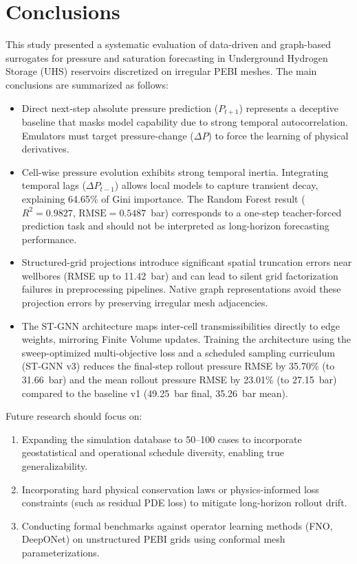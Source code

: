 \documentclass[10pt,twocolumn]{article}
\begin{document}
\section{Conclusions}
This study presented a systematic evaluation of data-driven and graph-based surrogates for pressure and saturation forecasting in Underground Hydrogen Storage (UHS) reservoirs discretized on irregular PEBI meshes. The main conclusions are summarized as follows:
\begin{itemize}
    \item Direct next-step absolute pressure prediction ($P_{t+1}$) represents a deceptive baseline that masks model capability due to strong temporal autocorrelation. Emulators must target pressure-change ($\Delta P$) to force the learning of physical derivatives.
    \item Cell-wise pressure evolution exhibits strong temporal inertia. Integrating temporal lags ($\Delta P_{t-1}$) allows local models to capture transient decay, explaining 64.65\% of Gini importance. The Random Forest result ($R^2 = 0.9827$, $\text{RMSE} = 0.5487$~bar) corresponds to a one-step teacher-forced prediction task and should not be interpreted as long-horizon forecasting performance.
    \item Structured-grid projections introduce significant spatial truncation errors near wellbores (RMSE up to 11.42~bar) and can lead to silent grid factorization failures in preprocessing pipelines. Native graph representations avoid these projection errors by preserving irregular mesh adjacencies.
    \item The ST-GNN architecture maps inter-cell transmissibilities directly to edge weights, mirroring Finite Volume updates. Training the architecture using the sweep-optimized multi-objective loss and a scheduled sampling curriculum (ST-GNN v3) reduces the final-step rollout pressure RMSE by 35.70\% (to 31.66~bar) and the mean rollout pressure RMSE by 23.01\% (to 27.15~bar) compared to the baseline v1 (49.25~bar final, 35.26~bar mean).
\end{itemize}

Future research should focus on:
\begin{enumerate}
    \item Expanding the simulation database to 50--100 cases to incorporate geostatistical and operational schedule diversity, enabling true generalizability.
    \item Incorporating hard physical conservation laws or physics-informed loss constraints (such as residual PDE loss) to mitigate long-horizon rollout drift.
    \item Conducting formal benchmarks against operator learning methods (FNO, DeepONet) on unstructured PEBI grids using conformal mesh parameterizations.
\end{enumerate}
\end{document}
